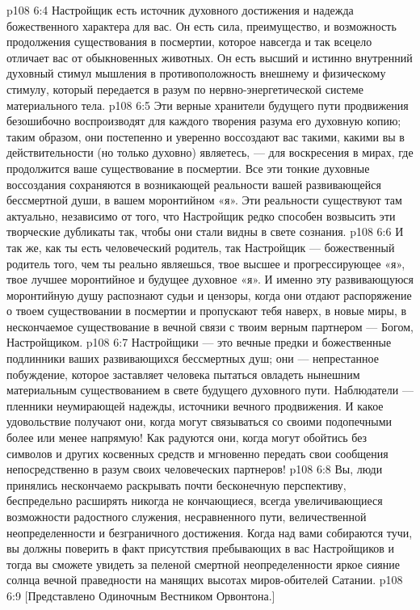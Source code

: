 \vs p108 6:4 Настройщик есть источник духовного достижения и надежда божественного характера для вас. Он есть сила, преимущество, и возможность продолжения существования в посмертии, которое навсегда и так всецело отличает вас от обыкновенных животных. Он есть высший и истинно внутренний духовный стимул мышления в противоположность внешнему и физическому стимулу, который передается в разум по нервно\hyp{}энергетической системе материального тела.
\vs p108 6:5 Эти верные хранители будущего пути продвижения безошибочно воспроизводят для каждого творения разума его духовную копию; таким образом, они постепенно и уверенно воссоздают вас такими, какими вы в действительности (но только духовно) являетесь, --- для воскресения в мирах, где продолжится ваше существование в посмертии. Все эти тонкие духовные воссоздания сохраняются в возникающей реальности вашей развивающейся бессмертной души, в вашем моронтийном «я». Эти реальности существуют там актуально, независимо от того, что Настройщик редко способен возвысить эти творческие дубликаты так, чтобы они стали видны в свете сознания.
\vs p108 6:6 \pc И так же, как ты есть человеческий родитель, так Настройщик --- божественный родитель того, чем ты реально являешься, твое высшее и прогрессирующее «я», твое лучшее моронтийное и будущее духовное «я». И именно эту развивающуюся моронтийную душу распознают судьи и цензоры, когда они отдают распоряжение о твоем существовании в посмертии и пропускают тебя наверх, в новые миры, в нескончаемое существование в вечной связи с твоим верным партнером --- Богом, Настройщиком.
\vs p108 6:7 Настройщики --- это вечные предки и божественные подлинники ваших развивающихся бессмертных душ; они --- непрестанное побуждение, которое заставляет человека пытаться овладеть нынешним материальным существованием в свете будущего духовного пути. Наблюдатели --- пленники неумирающей надежды, источники вечного продвижения. И какое удовольствие получают они, когда могут связываться со своими подопечными более или менее напрямую! Как радуются они, когда могут обойтись без символов и других косвенных средств и мгновенно передать свои сообщения непосредственно в разум своих человеческих партнеров!
\vs p108 6:8 \pc Вы, люди принялись нескончаемо раскрывать почти бесконечную перспективу, беспредельно расширять никогда не кончающиеся, всегда увеличивающиеся возможности радостного служения, несравненного пути, величественной неопределенности и безграничного достижения. Когда над вами собираются тучи, вы должны поверить в факт присутствия пребывающих в вас Настройщиков и тогда вы сможете увидеть за пеленой смертной неопределенности яркое сияние солнца вечной праведности на манящих высотах миров\hyp{}обителей Сатании.
\vsetoff
\vs p108 6:9 [Представлено Одиночным Вестником Орвонтона.]
